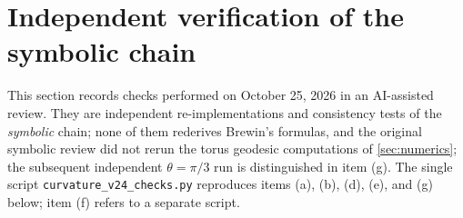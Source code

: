 \documentclass[11pt]{amsart}
\numberwithin{equation}{section}
\theoremstyle{remark}
\begin{document}
\FloatBarrier
\section{Independent verification of the symbolic chain}\label{sec:verify}

This section records checks performed on October 25, 2026 in an AI-assisted review. They are independent re-implementations and consistency tests of the \emph{symbolic} chain; none of them rederives Brewin's formulas, and the original symbolic review did not rerun the torus geodesic computations of \cref{sec:numerics}; the subsequent independent $\theta=\pi/3$ run is distinguished in item (g). The single script \texttt{curvature\_v24\_checks.py} reproduces items (a), (b), (d), (e), and (g) below; item (f) refers to a separate script.
\end{document}

